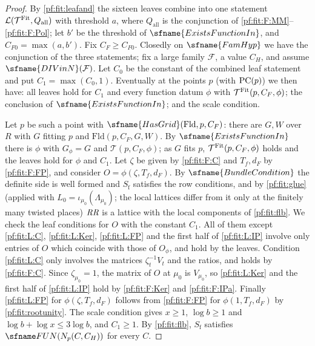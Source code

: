 \begin{proof}
By \cref{pf:fit:leafand} the sixteen leaves combine into one statement $\mathcal L(\mathcal T^{\mathrm{Fit}},Q_{\mathrm{all}})$ with
threshold $a$, where $Q_{\mathrm{all}}$ is the conjunction of \ref{pf:fit:F:MM}--\ref{pf:fit:F:Pol}; let $b'$ be the
threshold of $\sfname{ExistsFunctionIn}$, and $C_{F0}=\max(a,b')$. Fix $C_F\ge C_{F0}$. Closedly on $\sfname{FamHyp}$ we
have the conjunction of the three statements; fix a large family $\mathcal F$, a value $C_H$, and assume
$\sfname{DIVinN}(\mathcal F)$. Let $C_0$ be the constant of the combined leaf statement and put $C_1=\max(C_0,1)$.
Eventually at the points $p$ (with $\mathrm{PC}(p)$) we then have: all leaves hold for $C_1$ and every function datum $\phi$ with
$\mathcal T^{\mathrm{Fit}}(p,C_F,\phi)$; the conclusion of $\sfname{ExistsFunctionIn}$; and the scale condition.

Let $p$ be such a point with $\sfname{HasGrid}(\mathrm{Fld},p,C_F)$: there are $G,W$ over $R$ with $G$ fitting $p$ and
$\mathrm{Fld}(p,C_F,G,W)$. By $\sfname{ExistsFunctionIn}$ there is $\phi$ with $G_\phi=G$ and $\mathcal T(p,C_F,\phi)$; as $G$ fits $p$,
$\mathcal T^{\mathrm{Fit}}(p,C_F,\phi)$ holds and the leaves hold for $\phi$ and $C_1$. Let $\zeta$ be given by \ref{pf:fit:F:C} and
$T_f,d_F$ by \ref{pf:fit:F:FP}, and consider $O=\phi(\zeta,T_f,d_F)$. By $\sfname{BundleCondition}$ the definite side is well
formed and $S_{\mathrm f}$ satisfies the row conditions, and by \cref{pf:fit:glue} (applied with $L_0=\iota_{\mu_0}
(\Lambda_{\mu_0})$; the local lattices differ from it only at the finitely many twisted places) $\mathit{RR}$ is a lattice with
the local components of \cref{pf:fit:flb}. We check the leaf conditions for $O$ with the constant $C_1$. All of them
except \ref{pf:fit:L:C}, \ref{pf:fit:L:Ker}, \ref{pf:fit:L:FP} and the first half of \ref{pf:fit:L:IP} involve only
entries of $O$ which coincide with those of $O_\phi$, and hold by the leaves. Condition \ref{pf:fit:L:C} only involves the
matrices $\zeta_t^{-1}V_t$ and the ratios, and holds by \ref{pf:fit:F:C}. Since $\zeta_{\mu_0}=1$, the matrix of $O$ at
$\mu_0$ is $V_{\mu_0}$, so \ref{pf:fit:L:Ker} and the first half of \ref{pf:fit:L:IP} hold by \ref{pf:fit:F:Ker} and
\ref{pf:fit:F:IPa}. Finally \ref{pf:fit:L:FP} for $\phi(\zeta,T_f,d_F)$ follows from \ref{pf:fit:F:FP} for $\phi(1,T_f,d_F)$ by
\cref{pf:fit:rootunity}. The scale condition
gives $x\ge1$, $\log b\ge1$ and $\log b+\log x\le3\log b$, and $C_1\ge1$. By \cref{pf:fit:flb}, $S_{\mathrm f}$
satisfies $\fitFUN(N_p(C,C_H))$ for every $C$.
\end{proof}

